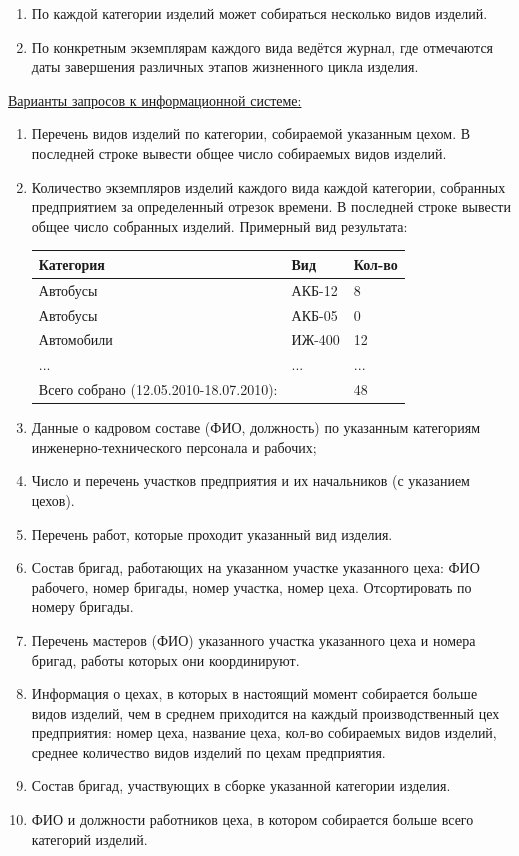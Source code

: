 \begin{enumerate}
    \item По каждой категории изделий может собираться несколько видов изделий.
    \item По конкретным экземплярам каждого вида ведётся журнал, где отмечаются даты завершения различных этапов жизненного цикла изделия.

\end{enumerate}

\underline{Варианты запросов к информационной системе:}
\begin{enumerate}

    \item Перечень видов изделий по категории, собираемой указанным цехом.
    В последней строке вывести общее число собираемых видов изделий.

    \item Количество экземпляров изделий каждого вида каждой категории, собранных предприятием за определенный отрезок времени.
    В последней строке вывести общее число собранных изделий.
    Примерный вид результата:

    \begin{tabular}{|p{6cm}|p{2cm}|p{1cm}|} \hline
        Категория & Вид & Кол-во \\ \hline
        Автобусы & АКБ-12 & 8 \\ \hline
        Автобусы & АКБ-05 & 0 \\ \hline
        Автомобили & ИЖ-400 & 12 \\ \hline
        ... & ... & ... \\ \hline
        Всего собрано (12.05.2010-18.07.2010): & & 48 \\ \hline
    \end{tabular}

    \item Данные о кадровом составе (ФИО, должность) по указанным категориям инженерно-технического персонала и рабочих;
    \item Число и перечень участков предприятия и их начальников (с указанием цехов).
    \item Перечень работ, которые проходит указанный вид изделия.
    \item Состав бригад, работающих на указанном участке указанного цеха: ФИО рабочего, номер бригады, номер участка, номер цеха. Отсортировать по номеру бригады.
    \item Перечень мастеров (ФИО) указанного участка указанного цеха и номера бригад, работы которых они координируют.
    \item Информация о цехах, в которых в настоящий момент собирается больше видов изделий, чем в среднем приходится на каждый производственный цех предприятия: номер цеха, название цеха, кол-во собираемых видов изделий, среднее количество видов изделий по цехам предприятия.
    \item Состав бригад, участвующих в сборке указанной категории изделия.
    \item ФИО и должности работников цеха, в котором собирается больше всего категорий изделий.

\end{enumerate}

